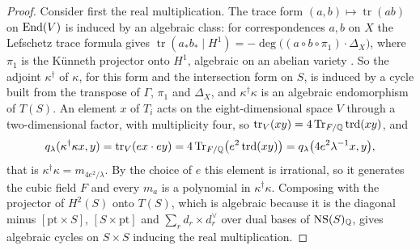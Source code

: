 \begin{proof}
Consider first the real multiplication. The trace form
$(a,b)\mapsto\operatorname{tr}(ab)$ on $\operatorname{End}(V)$ is induced by an algebraic
class: for correspondences $a,b$ on $X$
the Lefschetz trace formula gives
$\operatorname{tr}(a_{*}b_{*}\mid H^{1})=-\deg\bigl((a\circ b\circ\pi_{1})\cdot\Delta_{X}\bigr)$,
where $\pi_{1}$ is the K\"unneth projector onto $H^{1}$, algebraic on an
abelian variety \cite[\S2]{Kle68}. So the adjoint $\kappa^{\dagger}$ of
$\kappa$, for this form and the intersection form on $S$, is induced by a
cycle built from the transpose of $\Gamma$, $\pi_{1}$ and $\Delta_{X}$, and
$\kappa^{\dagger}\kappa$ is an algebraic endomorphism of $T(S)$. An element
$x$ of $T_{i}$ acts on the eight-dimensional space $V$ through a
two-dimensional factor, with multiplicity four, so
$\operatorname{tr}_{V}(xy)=4\operatorname{Tr}_{F/\mathbb{Q}}\operatorname{trd}(xy)$, and
\[
  q_{\lambda}(\kappa^{\dagger}\kappa x,y)
  =\operatorname{tr}_{V}(ex\cdot ey)
  =4\operatorname{Tr}_{F/\mathbb{Q}}\bigl(e^{2}\operatorname{trd}(xy)\bigr)
  =q_{\lambda}\bigl(4e^{2}\lambda^{-1}x,y\bigr),
\]
that is $\kappa^{\dagger}\kappa=m_{4e^{2}/\lambda}$. By the choice of $e$ this
element is irrational, so it generates the cubic field $F$ and every $m_{a}$
is a polynomial in $\kappa^{\dagger}\kappa$. Composing with the projector of
$H^{2}(S)$ onto $T(S)$, which is algebraic because it is the diagonal minus
$[\mathrm{pt}\times S]$, $[S\times\mathrm{pt}]$ and $\sum_{r}d_{r}\times d_{r}^{\vee}$
over dual bases of $\mathrm{NS}(S)_{\mathbb{Q}}$, gives algebraic cycles on $S\times S$
inducing the real multiplication.


\end{proof}
